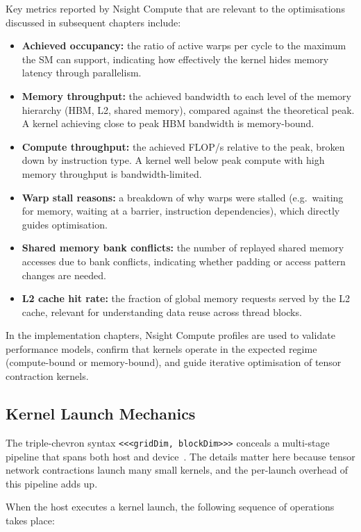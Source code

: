 Key metrics reported by Nsight Compute that are relevant to the optimisations discussed in subsequent chapters include:

\begin{itemize}
  \item \textbf{Achieved occupancy:} the ratio of active warps per cycle to the maximum the SM can support, indicating how effectively the kernel hides memory latency through parallelism.
  \item \textbf{Memory throughput:} the achieved bandwidth to each level of the memory hierarchy (HBM, L2, shared memory), compared against the theoretical peak. A kernel achieving close to peak HBM bandwidth is memory-bound.
  \item \textbf{Compute throughput:} the achieved FLOP/s relative to the peak, broken down by instruction type. A kernel well below peak compute with high memory throughput is bandwidth-limited.
  \item \textbf{Warp stall reasons:} a breakdown of why warps were stalled (e.g.\ waiting for memory, waiting at a barrier, instruction dependencies), which directly guides optimisation.
  \item \textbf{Shared memory bank conflicts:} the number of replayed shared memory accesses due to bank conflicts, indicating whether padding or access pattern changes are needed.
  \item \textbf{L2 cache hit rate:} the fraction of global memory requests served by the L2 cache, relevant for understanding data reuse across thread blocks.
\end{itemize}

In the implementation chapters, Nsight Compute profiles are used to validate
performance models, confirm that kernels operate in the expected regime
(compute-bound or memory-bound), and guide iterative optimisation of tensor
contraction kernels.

\subsection{Kernel Launch Mechanics}\label{sec:kernel-launch-mechanics}

The triple-chevron syntax \texttt{<<<gridDim, blockDim>>>} conceals a
multi-stage pipeline that spans both host and device~\cite{nvidia-cuda-guide}.
The details matter here because tensor network contractions launch many small
kernels, and the per-launch overhead of this pipeline adds up.

When the host executes a kernel launch, the following sequence of operations
takes place:

